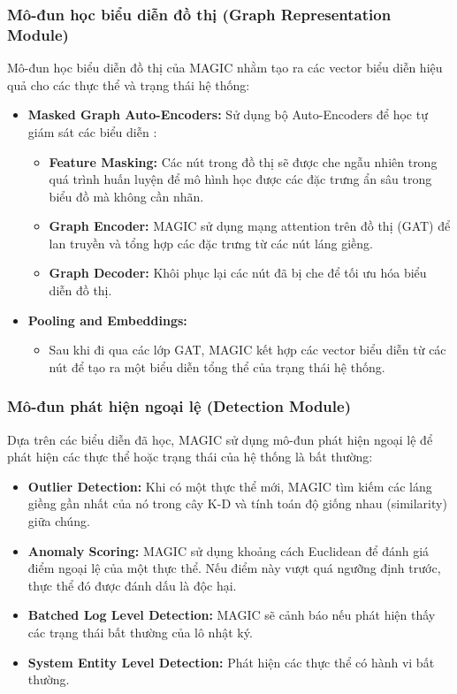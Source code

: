 \subsubsection{Mô-đun học biểu diễn đồ thị (Graph Representation Module)}
Mô-đun học biểu diễn đồ thị của MAGIC nhằm tạo ra các vector biểu diễn hiệu quả cho các thực thể và trạng thái hệ thống:

\begin{itemize}
    \item \textbf{Masked Graph Auto-Encoders:} Sử dụng bộ Auto-Encoders để học tự giám sát các biểu diễn :
    \begin{itemize}
        \item \textbf{Feature Masking:} Các nút trong đồ thị sẽ được che ngẫu nhiên trong quá trình huấn luyện để mô hình học được các đặc trưng ẩn sâu trong biểu đồ mà không cần nhãn.
        \item \textbf{Graph Encoder:} MAGIC sử dụng mạng attention trên đồ thị (GAT) để lan truyền và tổng hợp các đặc trưng từ các nút láng giềng. 
        \item \textbf{Graph Decoder:} Khôi phục lại các nút đã bị che để tối ưu hóa biểu diễn đồ thị. 
    \end{itemize}
    \item \textbf{Pooling and Embeddings:}
    \begin{itemize}
        \item Sau khi đi qua các lớp GAT, MAGIC kết hợp các vector biểu diễn từ các nút để tạo ra một biểu diễn tổng thể của trạng thái hệ thống. 
    \end{itemize}
\end{itemize}

\subsubsection{Mô-đun phát hiện ngoại lệ (Detection Module)}
Dựa trên các biểu diễn đã học, MAGIC sử dụng mô-đun phát hiện ngoại lệ để phát hiện các thực thể hoặc trạng thái của hệ thống là bất thường:

\begin{itemize}
    \item \textbf{Outlier Detection:} Khi có một thực thể mới, MAGIC tìm kiếm các láng giềng gần nhất của nó trong cây K-D và tính toán độ giống nhau (similarity) giữa chúng.
    \item \textbf{Anomaly Scoring:} MAGIC sử dụng khoảng cách Euclidean để đánh giá điểm ngoại lệ của một thực thể. Nếu điểm này vượt quá ngưỡng định trước, thực thể đó được đánh dấu là độc hại.
    \item \textbf{Batched Log Level Detection:} MAGIC sẽ cảnh báo nếu phát hiện thấy các trạng thái bất thường của lô nhật ký.
    \item \textbf{System Entity Level Detection:} Phát hiện các thực thể có hành vi bất thường.
\end{itemize}

